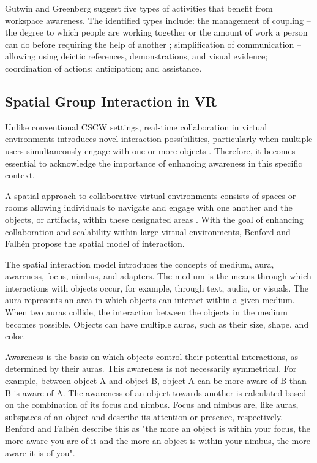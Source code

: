     Gutwin and Greenberg \cite{gutwinDescriptiveFrameworkWorkspace2002} suggest five types of activities that benefit from workspace awareness. The identified types include: the management of coupling -- the degree to which people are working together \cite{salvadorDenverModelGroupware1996} or the amount of work a person can do before requiring the help of another \cite{gutwinDescriptiveFrameworkWorkspace2002}; simplification of communication -- allowing using deictic references, demonstrations, and visual evidence; coordination of actions; anticipation; and assistance.


    \subsection{Spatial Group Interaction in VR} \label{sec:sota_spatial}

    Unlike conventional CSCW settings, real-time collaboration in virtual environments introduces novel interaction possibilities, particularly when multiple users simultaneously engage with one or more objects \cite{brollInteractingDistributedCollaborative1995}. Therefore, it becomes essential to acknowledge the importance of enhancing awareness in this specific context.

    A spatial approach to collaborative virtual environments consists of spaces or rooms allowing individuals to navigate and engage with one another and the objects, or artifacts, within these designated areas \cite{benfordSpatialModelInteraction1993}. With the goal of enhancing collaboration and scalability within large virtual environments, Benford and Falhén \cite{benfordSpatialModelInteraction1993} propose the spatial model of interaction. 

    The spatial interaction model introduces the concepts of medium, aura, awareness, focus, nimbus, and adapters. The medium is the means through which interactions with objects occur, for example, through text, audio, or visuals. The aura represents an area in which objects can interact within a given medium. When two auras collide, the interaction between the objects in the medium becomes possible. Objects can have multiple auras, such as their size, shape, and color.

    Awareness is the basis on which objects control their potential interactions, as determined by their auras. This awareness is not necessarily symmetrical. For example, between object A and object B, object A can be more aware of B than B is aware of A. The awareness of an object towards another is calculated based on the combination of its focus and nimbus. Focus and nimbus are, like auras, subspaces of an object and describe its attention or presence, respectively. Benford and Falhén \cite{benfordSpatialModelInteraction1993} describe this as "the more an object is within your focus, the more aware you are of it and the more an object is within your nimbus, the more aware it is of you".

